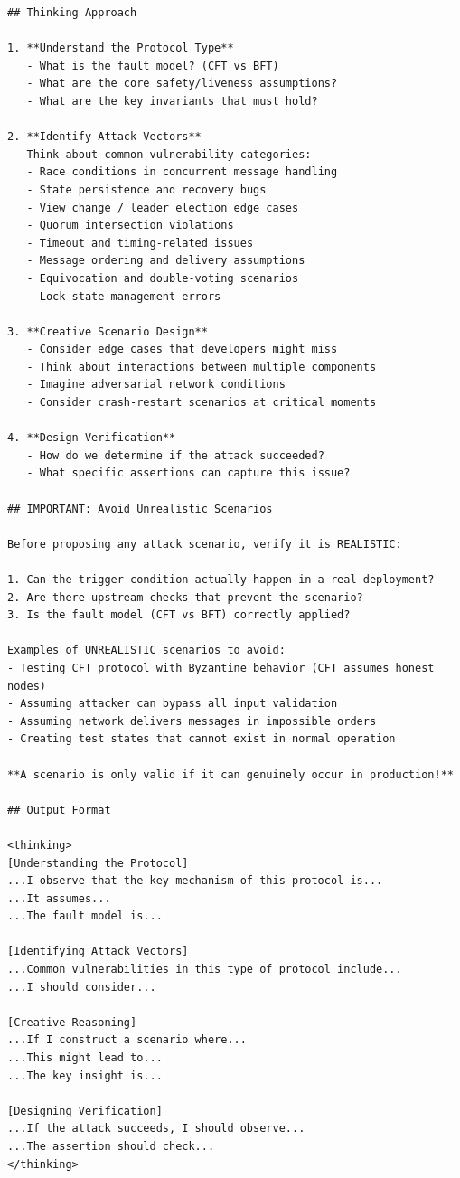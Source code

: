 \documentclass{article}
\theoremstyle{plain}
\theoremstyle{definition}
\theoremstyle{remark}
\begin{document}
\begin{agentbox}
{\begin{Verbatim}[fontsize=\scriptsize]
## Thinking Approach

1. **Understand the Protocol Type**
   - What is the fault model? (CFT vs BFT)
   - What are the core safety/liveness assumptions?
   - What are the key invariants that must hold?

2. **Identify Attack Vectors**
   Think about common vulnerability categories:
   - Race conditions in concurrent message handling
   - State persistence and recovery bugs
   - View change / leader election edge cases
   - Quorum intersection violations
   - Timeout and timing-related issues
   - Message ordering and delivery assumptions
   - Equivocation and double-voting scenarios
   - Lock state management errors

3. **Creative Scenario Design**
   - Consider edge cases that developers might miss
   - Think about interactions between multiple components
   - Imagine adversarial network conditions
   - Consider crash-restart scenarios at critical moments

4. **Design Verification**
   - How do we determine if the attack succeeded?
   - What specific assertions can capture this issue?

## IMPORTANT: Avoid Unrealistic Scenarios

Before proposing any attack scenario, verify it is REALISTIC:

1. Can the trigger condition actually happen in a real deployment?
2. Are there upstream checks that prevent the scenario?
3. Is the fault model (CFT vs BFT) correctly applied?

Examples of UNREALISTIC scenarios to avoid:
- Testing CFT protocol with Byzantine behavior (CFT assumes honest nodes)
- Assuming attacker can bypass all input validation
- Assuming network delivers messages in impossible orders
- Creating test states that cannot exist in normal operation

**A scenario is only valid if it can genuinely occur in production!**

## Output Format

<thinking>
[Understanding the Protocol]
...I observe that the key mechanism of this protocol is...
...It assumes...
...The fault model is...

[Identifying Attack Vectors]
...Common vulnerabilities in this type of protocol include...
...I should consider...

[Creative Reasoning]
...If I construct a scenario where...
...This might lead to...
...The key insight is...

[Designing Verification]
...If the attack succeeds, I should observe...
...The assertion should check...
</thinking>


\end{Verbatim}}
\end{agentbox}
\end{document}
